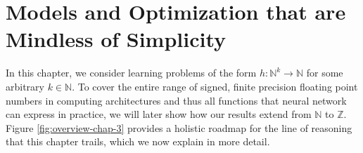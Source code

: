 
\chapter{Models and Optimization that are Mindless of Simplicity}
\label{chap:models-optimization-kolmogorov}
In this chapter, we consider learning problems of the form $h:\mathbb{N}^k\to\mathbb{N}$ for some arbitrary $k\in\mathbb{N}$.
To cover the entire range of signed, finite precision floating point numbers in computing architectures and thus all functions that neural network can express in practice, we will later show how our results extend from $\mathbb{N}$ to $\mathbb{Z}$.
Figure \ref{fig:overview-chap-3} provides a holistic roadmap for the line of reasoning that this chapter trails, which we now explain in more detail.
